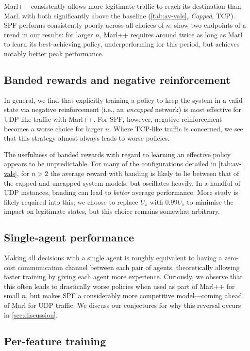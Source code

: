 \documentclass[conference, letterpaper, 10pt, times]{IEEEtran}
\begin{document}
Marl++ consistently allows more legitimate traffic to reach its destination than Marl, with both significantly above the baseline (\cref{tab:av-vals}, \emph{Capped}, TCP).
SPF performs consistently poorly across all choices of $n$.
 show two endpoints of a trend in our results: for larger $n$, Marl++ requires around twice as long as Marl to learn its best-achieving policy, underperforming for this period, but achieves notably better peak performance.

\subsection{Banded rewards and negative reinforcement}
In general, we find that explicitly training a policy to keep the system in a valid state via negative reinforcement (i.e., an \emph{uncapped} network) is most effective for UDP-like traffic with Marl++.
For SPF, however, negative reinforcement becomes a worse choice for larger $n$.
Where TCP-like traffic is concerned, we see that this strategy almost always leads to worse policies.

The usefulness of banded rewards with regard to learning an effective policy appears to be unpredictable.
For many of the configurations detailed in \cref{tab:av-vals}, for $n>2$ the average reward with banding is likely to lie between that of the capped and uncapped system models, but oscillates heavily.
In a handful of UDP instances, banding can lead to \emph{better} average performance.
More study is likely required into this; we choose to replace $U_s$ with $0.99U_s$ to minimise the impact on legitimate states, but this choice remains somewhat arbitrary.

\subsection{Single-agent performance}
Making all decisions with a single agent is roughly equivalent to having a zero-cost communication channel between each pair of agents, theoretically allowing faster training by giving each agent more experience.
Curiously, we observe that this often leads to drastically worse policies when used as part of Marl++ for small $n$, but makes SPF a considerably more competitive model---coming ahead of Marl for UDP traffic.
We discuss our conjectures for why this reversal occurs in \cref{sec:discussion}.

\subsection{Per-feature training}
\end{document}
